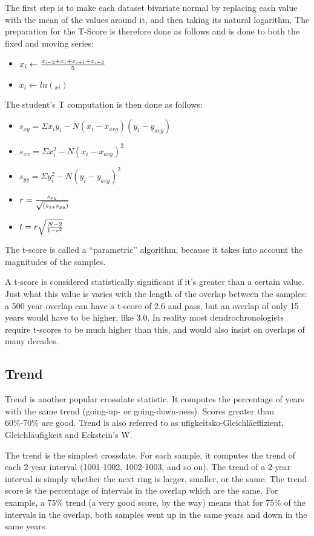 The first step is to make each dataset bivariate normal by replacing each value with the mean of the values around it, and then taking its natural logarithm.  The preparation for the T-Score is therefore done as follows and is done to both the fixed and moving series:

\begin{itemize}
 \item $x_{i} \leftarrow {x_{i-2} + x_{i} + x_{i+1} + x_{i+2} \over 5}$
 \item $x_{i} \leftarrow ln(_{xi})$
\end{itemize}

The student's T computation is then done as follows:

\begin{itemize}
 \item $s_{xy} = \Sigma x_{i} y_{i} - N (x_{i} - x_{avg}) (y_{i} - y_{avg})$
 \item $s_{xx} = \Sigma x_{i}^{2} - N (x_{i} - x_{avg})^{2}$
 \item $s_{yy} = \Sigma y_{i}^{2} - N (y_{i} - y_{avg})^{2}$
 \item $r = {s_{xy} \over \sqrt{(s_{xx} s_{yy})}}$
 \item $t = r \sqrt{{N-2\over 1-r^{2}}}$
\end{itemize}

The t-score is called a ``parametric'' algorithm, because it takes into account the magnitudes of the samples.

A t-score is considered statistically significant if it's greater than a certain value. Just what this value is varies with the length of the overlap between the samples: a 500 year overlap can have a t-score of 2.6 and pass, but an overlap of only 15 years would have to be higher, like 3.0.  In reality most dendrochronologists require t-scores to be much higher than this, and would also insist on overlaps of many decades.


\subsection{Trend}
Trend is another popular crossdate statistic.  It computes the percentage of years with the same trend (going-up- or going-down-ness). Scores greater than 60\%-70\% are good. Trend is also referred to as ufigkeitsko-Gleichläeffizient, Gleichläufigkeit and Eckstein's W.

The trend is the simplest crossdate. For each sample, it computes the trend of each 2-year interval (1001-1002, 1002-1003, and so on). The trend of a 2-year interval is simply whether the next ring is larger, smaller, or the same. The trend score is the percentage of intervals in the overlap which are the same. For example, a 75\% trend (a very good score, by the way) means that for 75\% of the intervals in the overlap, both samples went up in the same years and down in the same years.

